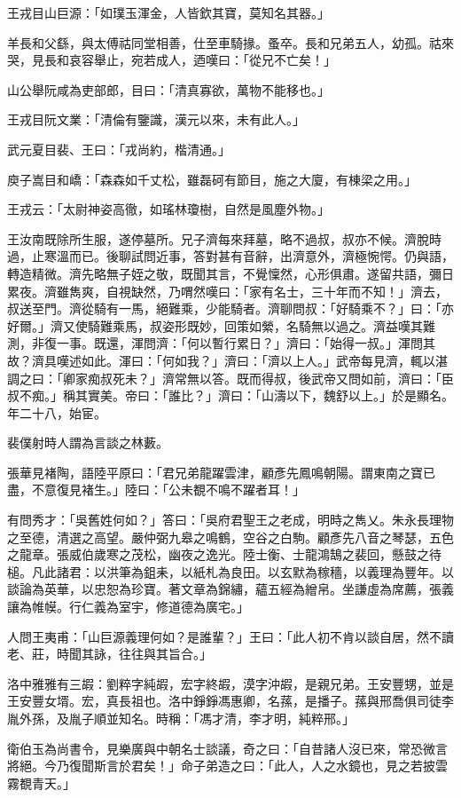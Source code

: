 王戎目山巨源：「如璞玉渾金，人皆欽其寶，莫知名其器。」

羊長和父繇，與太傅祜同堂相善，仕至車騎掾。蚤卒。長和兄弟五人，幼孤。祜來哭，見長和哀容舉止，宛若成人，迺嘆曰：「從兄不亡矣！」

山公舉阮咸為吏部郎，目曰：「清真寡欲，萬物不能移也。」

王戎目阮文業：「清倫有鑒識，漢元以來，未有此人。」

武元夏目裴、王曰：「戎尚約，楷清通。」

庾子嵩目和嶠：「森森如千丈松，雖磊砢有節目，施之大廈，有棟梁之用。」

王戎云：「太尉神姿高徹，如瑤林瓊樹，自然是風塵外物。」

王汝南既除所生服，遂停墓所。兄子濟每來拜墓，略不過叔，叔亦不候。濟脫時過，止寒溫而已。後聊試問近事，答對甚有音辭，出濟意外，濟極惋愕。仍與語，轉造精微。濟先略無子姪之敬，既聞其言，不覺懍然，心形俱肅。遂留共語，彌日累夜。濟雖雋爽，自視缺然，乃喟然嘆曰：「家有名士，三十年而不知！」濟去，叔送至門。濟從騎有一馬，絕難乘，少能騎者。濟聊問叔：「好騎乘不？」曰：「亦好爾。」濟又使騎難乘馬，叔姿形既妙，回策如縈，名騎無以過之。濟益嘆其難測，非復一事。既還，渾問濟：「何以暫行累日？」濟曰：「始得一叔。」渾問其故？濟具嘆述如此。渾曰：「何如我？」濟曰：「濟以上人。」武帝每見濟，輒以湛調之曰：「卿家痴叔死未？」濟常無以答。既而得叔，後武帝又問如前，濟曰：「臣叔不痴。」稱其實美。帝曰：「誰比？」濟曰：「山濤以下，魏舒以上。」於是顯名。年二十八，始宦。

裴僕射時人謂為言談之林藪。

張華見褚陶，語陸平原曰：「君兄弟龍躍雲津，顧彥先鳳鳴朝陽。謂東南之寶已盡，不意復見褚生。」陸曰：「公未覩不鳴不躍者耳！」

有問秀才：「吳舊姓何如？」答曰：「吳府君聖王之老成，明時之雋乂。朱永長理物之至德，清選之高望。嚴仲弼九皋之鳴鶴，空谷之白駒。顧彥先八音之琴瑟，五色之龍章。張威伯歲寒之茂松，幽夜之逸光。陸士衡、士龍鴻鵠之裴回，懸鼓之待槌。凡此諸君：以洪筆為鉏耒，以紙札為良田。以玄默為稼穡，以義理為豐年。以談論為英華，以忠恕為珍寶。著文章為錦繡，蘊五經為繒帛。坐謙虛為席薦，張義讓為帷幙。行仁義為室宇，修道德為廣宅。」

人問王夷甫：「山巨源義理何如？是誰輩？」王曰：「此人初不肯以談自居，然不讀老、莊，時聞其詠，往往與其旨合。」

洛中雅雅有三嘏：劉粹字純嘏，宏字終嘏，漠字沖嘏，是親兄弟。王安豐甥，並是王安豐女壻。宏，真長祖也。洛中錚錚馮惠卿，名蓀，是播子。蓀與邢喬俱司徒李胤外孫，及胤子順並知名。時稱：「馮才清，李才明，純粹邢。」

衛伯玉為尚書令，見樂廣與中朝名士談議，奇之曰：「自昔諸人沒已來，常恐微言將絕。今乃復聞斯言於君矣！」命子弟造之曰：「此人，人之水鏡也，見之若披雲霧覩青天。」

